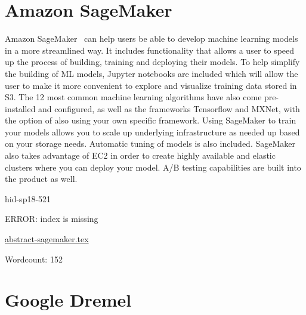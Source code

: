\section{Amazon SageMaker}
Amazon SageMaker~\cite{hid-sp18-521-Sagemaker} can help users
be able to develop machine learning models in a more streamlined way. It
includes functionality that allows a user to speed up the process of
building, training and deploying their models. To help simplify the 
building of ML models, Jupyter notebooks are included which will allow 
the user to make it more convenient to explore and visualize training 
data stored in S3. The 12 most common machine learning algorithms have 
also come pre-installed and configured, as well as the frameworks Tensorflow
and MXNet, with the option of also using your own specific framework. 
Using SageMaker to train your models allows you to scale up underlying 
infrastructure as needed up based on your storage needs. Automatic tuning
of models is also included. SageMaker also takes advantage of EC2 in order
to create highly available and elastic clusters where you can deploy your
model. A/B testing capabilities are built into the product as well. 


\begin{IU}

hid-sp18-521

ERROR: index is missing

\href{https://github.com/cloudmesh-community/hid-sp18-521/blob/master//technology/abstract-sagemaker.tex}{abstract-sagemaker.tex}

 

Wordcount: 152

\end{IU}

\section{Google Dremel}


